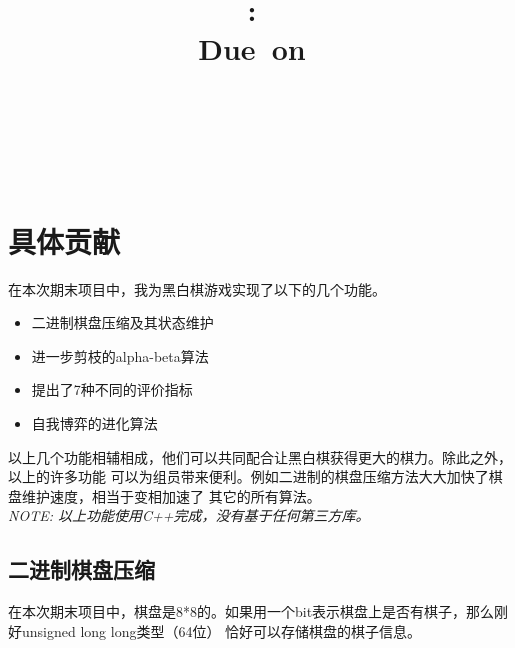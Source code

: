 \documentclass[a4paper]{article}
\title{
\vspace{2in}
\textmd{\textbf{\hmwkClass:\ \hmwkTitle}}\\
\normalsize\vspace{0.1in}\small{Due\ on\ \hmwkDueDate}\\
\vspace{0.1in}\large{\textit{\hmwkClassInstructor\ \hmwkClassTime}}
\vspace{3in}
}
\author{\textbf{\LARGE{\hmwkAuthorName}} \\ \\ \textbf{\LARGE{\hmwkAuthorId}}}
\date{} %
\begin{document}

\maketitle




\renewcommand{\contentsname}{Content} %
\newpage
\tableofcontents
{}
\newpage



\section{具体贡献}
在本次期末项目中，我为黑白棋游戏实现了以下的几个功能。
\begin{itemize}
    \item 二进制棋盘压缩及其状态维护
    \item 进一步剪枝的alpha-beta算法
    \item 提出了7种不同的评价指标
    \item 自我博弈的进化算法
\end{itemize}
以上几个功能相辅相成，他们可以共同配合让黑白棋获得更大的棋力。除此之外，以上的许多功能
可以为组员带来便利。例如二进制的棋盘压缩方法大大加快了棋盘维护速度，相当于变相加速了
其它的所有算法。\\

\emph{NOTE: 以上功能使用C++完成，没有基于任何第三方库。}
\subsection{二进制棋盘压缩}
在本次期末项目中，棋盘是8*8的。如果用一个bit表示棋盘上是否有棋子，那么刚好unsigned long long类型（64位）
恰好可以存储棋盘的棋子信息。\\
\end{document}
